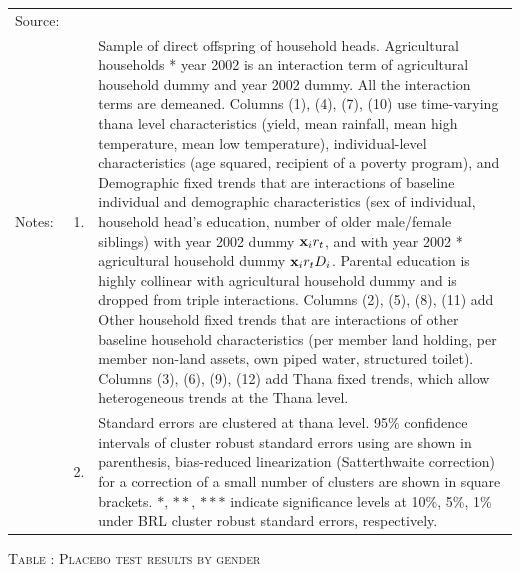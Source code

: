 \documentclass[12pt,letterpaper]{article}
\newcommand{\bfx}{\ensuremath{\mbox{\bf x}}}
\newcommand{\0}{\ensuremath{\mbox{\boldmath $0$}}}
\begin{document}
{\begin{table}
\renewcommand{\arraystretch}{1}
\hfil\begin{tabular}{>{\hfill\scriptsize}p{1cm}<{}>{\hfill\scriptsize}p{.5cm}<{}>{\scriptsize}p{12cm}<{\hfill}}
Source:& \multicolumn{2}{l}{\scriptsize Compiled from IFPRI data. }\\[-1ex]
Notes:& 1. & Sample of direct offspring of household heads. \textsf{Agricultural households * year 2002} is an interaction term of agricultural household dummy and year 2002 dummy. All the interaction terms are demeaned. Columns \textsf{(1), (4), (7), (10)} use time-varying thana level characteristics (yield, mean rainfall, mean high temperature, mean low temperature), individual-level characteristics (age squared, recipient of a poverty program), and \textsf{Demographic fixed trends} that are interactions of baseline individual and demographic characteristics (sex of individual, household head's education, number of older male/female siblings) with year 2002 dummy $\bfx_{i}r_{t}$, and with year 2002 * agricultural household dummy $\bfx_{i}r_{t}D_{i}$. Parental education is highly collinear with agricultural household dummy and is dropped from triple interactions. Columns \textsf{(2), (5), (8), (11)} add \textsf{Other household fixed trends} that are interactions of other baseline household characteristics (per member land holding, per member non-land assets, own piped water, structured toilet). Columns \textsf{(3), (6), (9), (12)} add \textsf{Thana fixed trends}, which allow heterogeneous trends at the Thana level. \\[-1ex]
& 2. & Standard errors are clustered at thana level. 95\% confidence intervals of cluster robust standard errors using \citep{liang1986longitudinal} are shown in parenthesis, bias-reduced linearization (Satterthwaite correction) for a correction of a small number of clusters are shown in square brackets. $*$, $**$, $***$ indicate significance levels at 10\%, 5\%, 1\% under BRL cluster robust standard errors, respectively.
\end{tabular}
\end{table}



\begin{table}
\hfil\textsc{\footnotesize Table \thetable: Placebo test results by gender\label{PlaceboResults10Table}}\\
\setlength{\tabcolsep}{1pt}
\renewcommand{\arraystretch}{.75}
\hfil


\end{table}}
\end{document}
